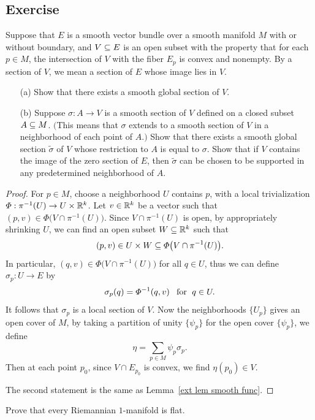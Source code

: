 \subsection{Exercise}
\begin{exercise}\label{vector bundle convex subset}
Suppose that $E$ is a smooth vector bundle over a smooth manifold $M$ with or without boundary, and $V\subseteq E$ is an open subset with the property that for each $p\in M$, the intersection of $V$ with the fiber $E_p$ is convex and nonempty. By a section of $V$, we mean a section of $E$ whose image lies in $V$.
\begin{itemize}
\item[(a)] Show that there exists a smooth global section of $V$.
\item[(b)] Suppose $\sigma:A\to V$ is a smooth section of $V$ defined on a closed subset $A\subseteq M$. $($This means that $\sigma$ extends to a smooth section of $V$ in a
neighborhood of each point of $A$.$)$ Show that there exists a smooth global section $\widetilde{\sigma}$ of $V$ whose restriction to $A$ is equal to $\sigma$. Show that if $V$ contains the image of the zero section of $E$, then $\widetilde{\sigma}$ can be chosen to be supported in any predetermined neighborhood of $A$.
\end{itemize}
\end{exercise}
\begin{proof}
For $p\in M$, choose a neighborhood $U$ contains $p$, with a local 
trivialization $\varPhi:\pi^{-1}(U)\to U\times\mathbb{R}^k$. Let $v\in\mathbb{R}^k$ be a 
vector such that $(p,v)\in\varPhi\big(V\cap\pi^{-1}(U)\big)$. Since 
$V\cap\pi^{-1}(U)$ is open, by appropriately shrinking $U$, we can find 
an open subset $W\subseteq\mathbb{R}^k$ such that 
\[(p,v)\in U\times W\subseteq\varPhi\big(V\cap\pi^{-1}(U)\big).\]
In particular, $(q,v)\in\varPhi\big(V\cap\pi^{-1}(U)\big)$ for all $q\in U$, thus we can define $\sigma_p:U\to E$ by
\[\sigma_p(q)=\varPhi^{-1}(q,v)\hspace{8pt}\text{for}\hspace{6pt} q\in U.\]
It follows that $\sigma_p$ is a local section of $V$. Now the neighborhoods $\{U_p\}$ gives an open cover of $M$, by taking a partition of unity $\{\psi_p\}$ for the open cover $\{\psi_p\}$, we define
\[\eta=\sum_{p\in M}\psi_p\sigma_p.\]
Then at each point $p_0$, since $V\cap E_{p_0}$ is convex, we find $\eta(p_0)\in V$.\par
The second statement is the same as Lemma~\ref{ext lem smooth func}.
\end{proof}
\begin{exercise}
Prove that every Riemannian $1$-manifold is flat.
\end{exercise}
